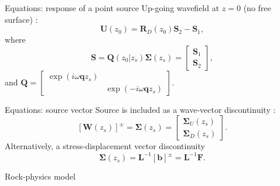 \documentclass[aspectratio=169]{beamer}
\newcommand\titleslide[1]{
	\begin{frame}
		\Huge
		\centering
		#1
	\end{frame}
	}
\begin{document}
\begin{frame}{Equations: response of a point source}\Large
	Up-going wavefield at $z=0$ (no free surface) \citep{ursin_review_1983}:
	\begin{equation}
		\mathbf{U}(z_0) = \mathbf{R}_D(z_0) \mathbf{S}_2 - \mathbf{S}_1,
	\end{equation}
	where
	\begin{equation}
		\mathbf{S} = \mathbf{Q}(z_0|z_s) \mathbf{\Sigma}(z_s) = \begin{bmatrix}\mathbf{S}_1\\\mathbf{S}_2\end{bmatrix},
	\end{equation}
	and
	$\mathbf{Q}=
	\begin{bmatrix}
	\exp\left(i \omega \mathbf{q} z_s\right) &\\
	& \exp\left(-i \omega \mathbf{q} z_s\right)	
	\end{bmatrix}$.
\end{frame}
\begin{frame}{Equations: source vector}\Large
	Source is included as a wave-vector discontinuity \citep{kennett_seismic_2009}:
	\begin{equation}
		\left[\mathbf{W}(z_s)\right]^\pm=\mathbf{\Sigma}(z_s) = \begin{bmatrix}\mathbf{\Sigma}_U(z_s)\\\mathbf{\Sigma}_D(z_s)\end{bmatrix}.
	\end{equation}
	Alternatively, a stress-displacement vector discontinuity
	\begin{equation}
		\mathbf{\Sigma}(z_s) = \mathbf{L}^{-1} \left[\mathbf{b}\right]^\pm=\mathbf{L}^{-1}\mathbf{F}.
	\end{equation}
\end{frame}
\titleslide{Rock-physics model}
\end{document}
